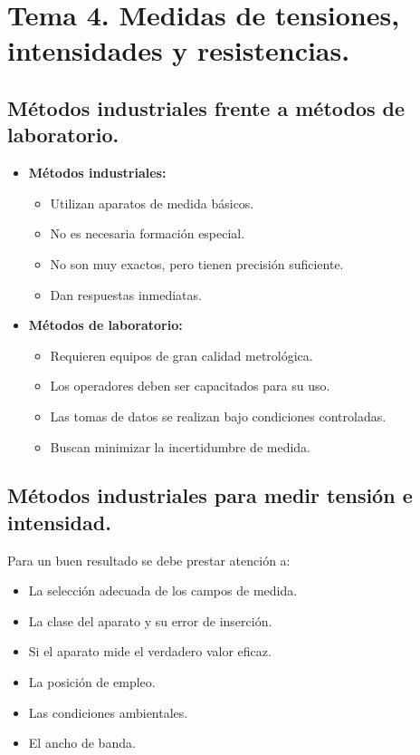 \section{Tema 4. Medidas de tensiones, intensidades y resistencias.}
\subsection{Métodos industriales frente a métodos de laboratorio.}
\begin{itemize}
	\item \textbf{Métodos industriales:}
	\begin{itemize}
		\item Utilizan aparatos de medida básicos.
		\item No es necesaria formación especial.
		\item No son muy exactos, pero tienen precisión suficiente.
		\item Dan respuestas inmediatas.
	\end{itemize}
	\item \textbf{Métodos de laboratorio:}
	\begin{itemize}
		\item Requieren equipos de gran calidad metrológica.
		\item Los operadores deben ser capacitados para su uso.
		\item Las tomas de datos se realizan bajo condiciones controladas.
		\item Buscan minimizar la incertidumbre de medida.
	\end{itemize}
\end{itemize}


\subsection{Métodos industriales para medir tensión e intensidad.}
Para un buen resultado se debe prestar atención a:
\begin{itemize}
	\item La selección adecuada de los campos de medida.
	\item La clase del aparato y su error de inserción.
	\item Si el aparato mide el verdadero valor eficaz.
	\item La posición de empleo.
	\item Las condiciones ambientales.
	\item El ancho de banda.
\end{itemize}
